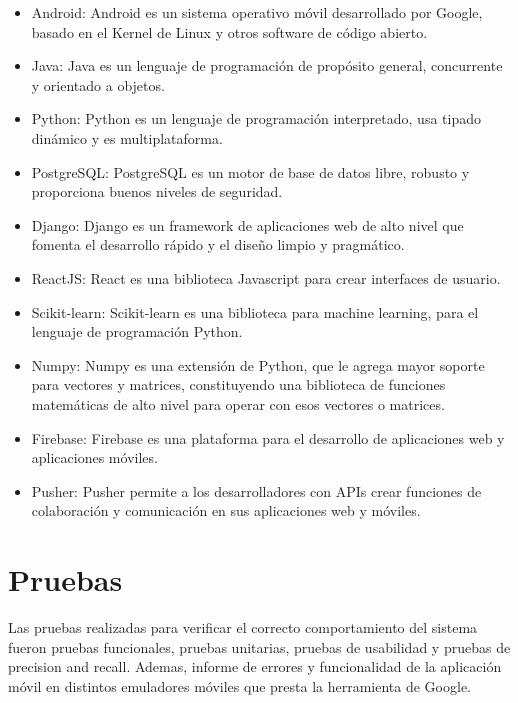 \documentclass[12pt,letterpaper,openany]{book}
\begin{document}
\begin{itemize}
    \item Android: Android \cite{27} es un sistema operativo móvil desarrollado por Google, basado en el Kernel de Linux y otros software de código abierto.
    \item Java: Java \cite{28} es un lenguaje de programación de propósito general, concurrente y orientado a objetos.
    \item Python: Python \cite{29} es un lenguaje de programación interpretado, usa tipado dinámico y es multiplataforma.
    \item PostgreSQL: PostgreSQL \cite{30} es un motor de base de datos libre, robusto y proporciona buenos niveles de seguridad.
    \item Django: Django \cite{31} es un framework de aplicaciones web de alto nivel que fomenta el desarrollo rápido y el diseño limpio y pragmático.
    \item ReactJS: React \cite{32} es una biblioteca Javascript para crear interfaces de usuario.
    \item Scikit-learn: Scikit-learn \cite{33} es una biblioteca para machine learning, para el lenguaje de programación Python.
    \item Numpy: Numpy \cite{34} es una extensión de Python, que le agrega mayor soporte para vectores y matrices, constituyendo una biblioteca de funciones matemáticas de alto nivel para operar con esos vectores o matrices.
    \item Firebase: Firebase \cite{35} es una plataforma para el desarrollo de aplicaciones web y aplicaciones móviles.
    \item Pusher: Pusher \cite{36} permite a los desarrolladores con APIs crear funciones de colaboración y comunicación en sus aplicaciones web y móviles.
\end{itemize}

\section{Pruebas}
Las pruebas realizadas para verificar el correcto comportamiento del sistema fueron pruebas funcionales, pruebas unitarias, pruebas de usabilidad y pruebas de precision and recall. Ademas, informe de errores y funcionalidad de la aplicación móvil en distintos emuladores móviles que presta la herramienta de Google.
\end{document}
